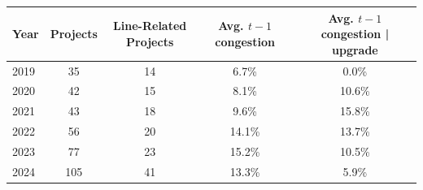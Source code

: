 \begin{table}[!htbp]
\centering
\small
\setlength{\tabcolsep}{6pt}
\renewcommand{\arraystretch}{1.00}
\begin{tabular}{@{}lcccc@{}}
\toprule
Year & Projects & Line-Related Projects & Avg. $t-1$ congestion & Avg. $t-1$ congestion | upgrade \\
\midrule
2019 & 35 & 14 & 6.7\% & 0.0\% \\
2020 & 42 & 15 & 8.1\% & 10.6\% \\
2021 & 43 & 18 & 9.6\% & 15.8\% \\
2022 & 56 & 20 & 14.1\% & 13.7\% \\
2023 & 77 & 23 & 15.2\% & 10.5\% \\
2024 & 105 & 41 & 13.3\% & 5.9\% \\
\bottomrule
\end{tabular}
\end{table}
